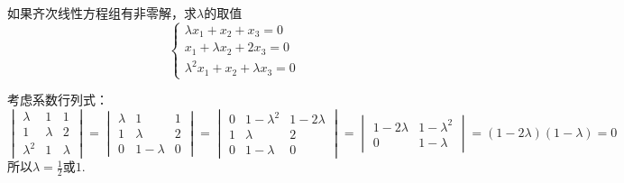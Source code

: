 \begin{example}{如果齐次线性方程组有非零解，求$\lambda$的取值}{}
\[\begin{cases}\lambda x_1+x_2+x_3=0\\x_1+\lambda x_2+2x_3=0\\\lambda^2x_1+x_2+\lambda x_3=0\end{cases}\]
\end{example}
\begin{solution}
    考虑系数行列式：\[
    \begin{vmatrix}\lambda&1&1\\1&\lambda&2\\\lambda^{2}&1&\lambda\end{vmatrix}=\begin{vmatrix}\lambda&1&1\\1&\lambda&2\\0&1-\lambda&0\end{vmatrix}=\begin{vmatrix}0&1-\lambda^2&1-2\lambda\\1&\lambda&2\\0&1-\lambda&0\end{vmatrix}=\begin{vmatrix}1-2\lambda&1-\lambda^2\\0&1-\lambda\end{vmatrix}=(1-2\lambda)(1-\lambda)=0\]
    所以$\lambda=\frac{1}{2}$或$1$.
\end{solution}